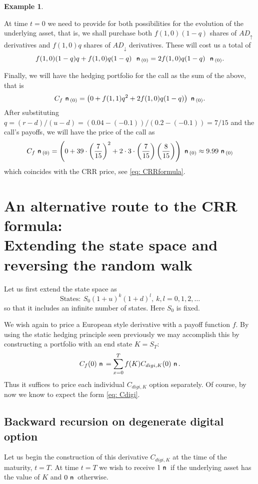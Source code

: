 \documentclass{amsart}
\theoremstyle{definition}
\newtheorem{example}[theorem]{Example}
\theoremstyle{remark}
\newcommand{\n}{\!\!\ \nn \!\!\ }
\def\nn{\mathrel{%
    \mathchoice{\n}{\n}{\scriptsize\n}{\tiny\n}%
}}
\def\n {{%
    \setbox0\hbox{ \textsf{n}\!\  }%
    \rlap{\hbox to \wd0{\hss \!\ --\hss}}\box0
}}
\numberwithin{equation}{section}
\newcommand{\1}{\boldsymbol{1}}
\newcommand{\ua}{\uparrow}
\newcommand{\da}{\downarrow}
\begin{document}
\begin{example}
\begin{itemize}
At time $t=0$ we need to provide for both possibilities for the evolution of the underlying asset, that is, we shall purchase both $f(1,0)(1-q)$ shares of $AD_\ua$ derivatives and $f(1,0)q$ shares of $AD_\da$ derivatives. These will cost us a total of
\[
f(1,0)(1-q)q+f(1,0)q(1-q)\ \n_{(0)}=2f(1,0)q(1-q)\ \n_{(0)}.
\]
\end{itemize}

Finally, we will have the hedging portfolio for the call as the sum of the above, that is
\[
C_f\n_{(0)}=\left(0+f(1,1)q^2+2f(1,0)q(1-q)\right)\n_{(0)}.
\]
After substituting $q=(r-d)/(u-d)=(0.04-(-0.1))/(0.2-(-0.1))=7/15$ and the call's payoffs, we will have the price of the call as
\[
C_f\n_{(0)}=\left(0+39\cdot\left(\frac{7}{15}\right)^2+2\cdot3\cdot\left(\frac{7}{15}\right)\left(\frac{8}{15}\right)\right)\n_{(0)}\approx 9.99 \n_{(0)}
\]
which coincides with the CRR price, see \eqref{eq: CRRformula}.

\end{example}



\section{An alternative route to the CRR formula:\\ Extending the state space and reversing the random walk}
\label{Subsection:extendedCRR}

Let us first extend the state space as
\begin{equation}
\label{eq:statespace}
 \text{States}: \ S_0(1+u)^k(1+d)^l ,\ k,l =0,1,2,\ldots
\end{equation}
so that it includes an infinite number of states. Here $S_0$ is fixed.

We wish again to price a European style derivative with a payoff function $f$. 
By using the static hedging principle seen previously we may accomplish this by constructing a portfolio 
with an end state $K=S_T$:
\[C_f(0) \n =\sum_{x=0}^{T}f(K ) C_{digi,K} (0) \n .\]
Thus it suffices to price each individual $C_{digi,K}$ option separately. Of course, by now we know to expect
the form \eqref{eq: Cdigi}.

\subsection{Backward recursion on degenerate digital option}
\label{Subsection:CRRdetails}
 
Let us begin the construction of this derivative $C_{digi, K}$ at the time of the maturity, $t=T$. At time $t=T$ we wish to receive $1 \n$ if the underlying asset has the value of $K$ and $0 \n$ otherwise.
\end{document}
